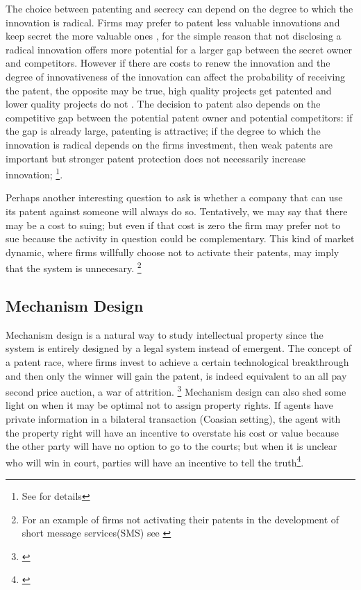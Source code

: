 \documentclass[12pt]{report}
\numberwithin{equation}{section}
\begin{document}
The choice between patenting and secrecy can depend on the degree to which the innovation is radical. Firms may prefer to patent less valuable innovations and keep secret the more valuable ones \cite{Anton2004} , for the simple reason that not disclosing a radical innovation offers more potential for a larger gap between the secret owner and competitors. However if there are costs to renew the innovation and the degree of innovativeness of the innovation can affect the probability of receiving the patent, the opposite may be true, high quality projects get patented and lower quality projects do not \citep{Mose2011}. The decision to patent also depends on the competitive gap between the potential patent owner and potential competitors: if the gap is already large, patenting is attractive; if the degree to which the innovation is radical depends on the firms investment, then weak patents are important but stronger patent protection does not necessarily increase innovation; \footnote{See \cite{Kultti2006} for details}. %

Perhaps another interesting question to ask is whether a company that can use its patent against someone will always do so. Tentatively, we may say that there may be a cost to suing; but even if that cost is zero the firm may prefer not to sue because the activity in question could be complementary. This kind of market dynamic, where firms willfully choose not to activate their patents, may imply that the system is unnecesary. \footnote{For an example of firms not activating their patents in the development of short message services(SMS) see \cite{corrocher2013development}}

\subsection{Mechanism Design}

Mechanism design is a natural way to study intellectual property since the system is entirely designed by a legal system instead of emergent. The concept of a patent race, where firms invest to achieve a certain technological breakthrough and then only the winner will gain the patent, is indeed equivalent to an all pay second price auction, a war of attrition. \footnote{ \cite{Games2003} } Mechanism design can also shed some light on when it may be optimal not to assign property rights. If agents have private information in a bilateral transaction (Coasian setting), the agent with the property right will have an incentive to overstate his cost or value because the other party will have no option to go to the courts; but when it is unclear who will win in court, parties will have an incentive to tell the truth\footnote{\cite{schmitz2001coase}}.
\end{document}

